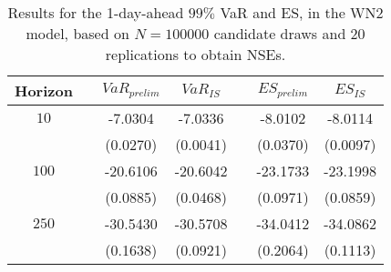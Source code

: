 \begin{table}[h] 
\centering 
\caption{Results for the 1-day-ahead $99\%$ VaR and ES, in the WN2 model, based on $N=100000$ candidate draws and $20$ replications to obtain NSEs.} 
\label{tab:res_WN2} 
\begin{tabular}{ccccccc}  
 Horizon & & $VaR_{prelim}$ & $VaR_{IS}$ & & $ES_{prelim}$ & $ES_{IS}$ \\ \hline 
$10$ & & -7.0304 & -7.0336 & & -8.0102 & -8.0114  \\ 
 & & (0.0270) & (0.0041) & & (0.0370) & (0.0097)   \\ [1ex] 
$100$ & & -20.6106 & -20.6042 & & -23.1733 & -23.1998  \\ 
 & & (0.0885) & (0.0468) & & (0.0971) & (0.0859)   \\ [1ex] 
$250$ & & -30.5430 & -30.5708 & & -34.0412 & -34.0862  \\ 
 & & (0.1638) & (0.0921) & & (0.2064) & (0.1113)   \\ [1ex] 
\hline 
\end{tabular} 
\end{table} 
